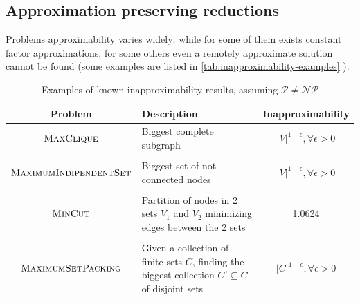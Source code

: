 \subsection{Approximation preserving reductions}%
\label{sub:approximation_preserving_reductions}

Problems approximability varies widely: while for some of them exists
constant factor approximations, for some others even a remotely approximate
solution cannot be found \cite{Ausiello2005} (some examples are listed in
\autoref{tab:inapproximability-examples} ).

\begin{table}
	\centering
	\caption{Examples of known inapproximability results, assuming $\mathcal{P}
			\neq \mathcal{NP} $ \cite{10.1007/3-540-63248-4_10} }
	\label{tab:inapproximability-examples}
	\begin{tabular}{c|p{5cm}|c}
		Problem                                                          & Description                                                   & Inapproximability \\
		\hline
		$ \textsc{MaxClique} $                                           & Biggest complete subgraph                                     & $|V|^{1-
		\epsilon}, \forall \epsilon > 0 $                                                                                                                    \\
		                                                                 &                                                               &                   \\
		$ \textsc{MaximumIndipendentSet} $                               &
		Biggest set of not connected nodes                               & $|V|^{1-
		\epsilon}, \forall \epsilon > 0 $                                                                                                                    \\
		                                                                 &                                                               &                   \\
		$ \textsc{MinCut} $                                              & Partition of nodes in 2 sets $V_1$ and $V_2$ minimizing edges
		between the 2 sets                                               & 1.0624                                                                            \\
		                                                                 &                                                               &                   \\
		$ \textsc{MaximumSetPacking} $                                   & Given a collection of
		finite sets $C$,
		finding the biggest collection $C' \subseteq C$ of disjoint sets & $|C|^{1-
		\epsilon}, \forall \epsilon > 0 $                                                                                                                    \\
	\end{tabular}
\end{table}

